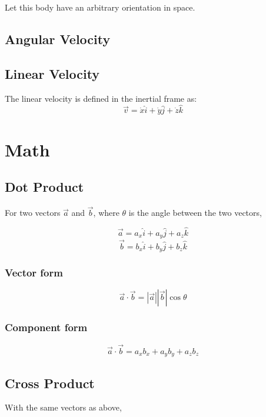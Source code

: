 \documentclass[a4paper,12pt]{article}
\begin{document}
Let this body have an arbitrary orientation in space. 
\subsection{Angular Velocity}


\subsection{Linear Velocity}
The linear velocity is defined in the inertial frame as:
\begin{equation}
    \vec{v} = \dot{x} \hat{i} + \dot{y} \hat{j} + \dot{z} \hat{k}
\end{equation}

\section{Math}
\subsection{Dot Product}
For two vectors \( \vec{a} \) and \( \vec{b} \), where \( \theta \) is the angle between the two vectors,

\begin{equation}
    \vec{a} = a_x \hat{i} + a_y \hat{j} + a_z \hat{k}
\end{equation}
\begin{equation}
    \vec{b} = b_x \hat{i} + b_y \hat{j} + b_z \hat{k}
\end{equation}

\subsubsection{Vector form}
\begin{equation}
    \vec{a} \cdot \vec{b} = |\vec{a}| |\vec{b}| \cos\theta
\end{equation}
\subsubsection{Component form}
\begin{equation}
    \vec{a} \cdot \vec{b} = a_x b_x + a_y b_y + a_z b_z
\end{equation}

\subsection{Cross Product}
With the same vectors as above,
\end{document}
